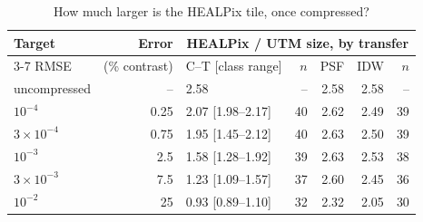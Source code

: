 \begin{table}[t]
\centering
\caption{How much larger is the HEALPix tile, once compressed?}
\label{tab:headline}
\scriptsize
\setlength{\tabcolsep}{4pt}
\begin{tabular}{@{}lrlrrrr@{}}
\toprule
Target & Error & \multicolumn{5}{c}{HEALPix / UTM size, by transfer} \\
\cmidrule(lr){3-7}
RMSE & (\% contrast) & C--T [class range] & $n$ & PSF & IDW & $n$ \\
\midrule
uncompressed & -- & 2.58 & -- & 2.58 & 2.58 & -- \\
\midrule
$10^{-4}$ & 0.25 & 2.07 [1.98--2.17] & 40 & 2.62 & 2.49 & 39 \\
$3\times10^{-4}$ & 0.75 & 1.95 [1.45--2.12] & 40 & 2.63 & 2.50 & 39 \\
$10^{-3}$ & 2.5 & 1.58 [1.28--1.92] & 39 & 2.63 & 2.53 & 38 \\
$3\times10^{-3}$ & 7.5 & 1.23 [1.09--1.57] & 37 & 2.60 & 2.45 & 36 \\
$10^{-2}$ & 25 & 0.93 [0.89--1.10] & 32 & 2.32 & 2.05 & 30 \\
\bottomrule
\end{tabular}
\end{table}
